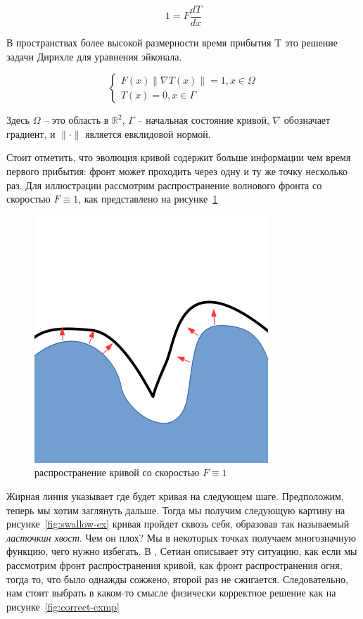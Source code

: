 \begin{equation*}
  1 = F \frac{dT}{dx}
\end{equation*}

В пространствах более высокой размерности время прибытия T это решение
задачи Дирихле для уравнения эйконала.

\begin{equation}
  \label{eq:eikonal}
  \left\{ \begin{matrix}
      F(x) \| \nabla T(x) \| = 1, x \in \Omega \\
      T(x) = 0, x \in \Gamma
    \end{matrix}\right.
\end{equation}

Здесь $\Omega$ -- это область в $\mathbb{R}^2$, $\Gamma$ -- начальная
состояние кривой, $\nabla$ обозначает градиент, и $\| \cdot \|$ является
евклидовой нормой.

Стоит отметить, что эволюция кривой содержит больше информации чем
время первого прибытия: фронт может проходить через одну и ту же точку
несколько раз. Для иллюстрации рассмотрим распространение
волнового фронта со скоростью $F \equiv 1$, как представлено на
рисунке~\ref{fig:prpgt-eik}

\begin{figure}[h]
  \centering
  \includegraphics[width=0.3\linewidth]{img/propagate_eikonal.png}
  \hfil \caption{распространение кривой со скоростью $F \equiv 1$}
  \label{fig:prpgt-eik}

\end{figure}

Жирная линия указывает где будет кривая на следующем шаге.
Предположим, теперь мы хотим заглянуть дальше. Тогда мы получим
следующую картину на рисунке~\ref{fig:swallow-ex} кривая пройдет
сквозь себя, образовав так называемый \textit{ласточкин хвост}. Чем он
плох? Мы в некоторых точках получаем многозначную функцию, чего нужно
избегать. В \cite{S1999}, Сетиан описывает эту ситуацию, как если мы
рассмотрим фронт распространения кривой, как фронт распространения
огня, тогда то, что было однажды сожжено, второй раз не сжигается.
Следовательно, нам стоит выбрать в каком-то смысле физически
корректное решение как на рисунке~\ref{fig:correct-exmp}

